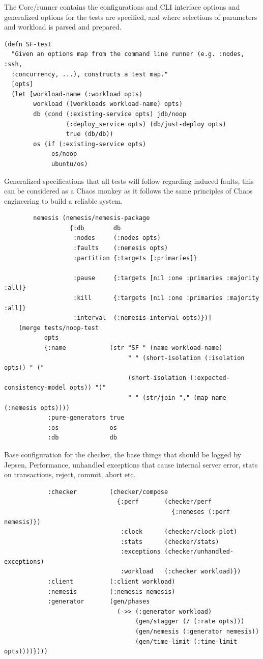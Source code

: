 \documentclass[a4paper,10pt,titlepage]{report}
\begin{document}
        The Core/runner contains the configurations and CLI interface options and generalized options for the tests are specified, and where selections of parameters and workload is parsed and prepared.
\begin{lstlisting}        
(defn SF-test
  "Given an options map from the command line runner (e.g. :nodes, :ssh,
  :concurrency, ...), constructs a test map."
  [opts]
  (let [workload-name (:workload opts)
        workload ((workloads workload-name) opts)
        db (cond (:existing-service opts) jdb/noop
                 (:deploy_service opts) (db/just-deploy opts)
                 true (db/db))
        os (if (:existing-service opts)
             os/noop
             ubuntu/os)
\end{lstlisting}  
Generalized specifications that all tests will follow regarding induced faults, this can be considered as a Chaos monkey \cite{Choasmonkey} as it follows the same principles of Chaos engineering to build a reliable system.
\begin{lstlisting}
        nemesis (nemesis/nemesis-package
                  {:db        db
                   :nodes     (:nodes opts)
                   :faults    (:nemesis opts)
                   :partition {:targets [:primaries]}
                   
                   :pause     {:targets [nil :one :primaries :majority :all]}
                   :kill      {:targets [nil :one :primaries :majority :all]}
                   :interval  (:nemesis-interval opts)})]
    (merge tests/noop-test
           opts
           {:name            (str "SF " (name workload-name)
                                  " " (short-isolation (:isolation opts)) " ("
                                  (short-isolation (:expected-consistency-model opts)) ")"
                                  " " (str/join "," (map name (:nemesis opts))))
            :pure-generators true
            :os              os
            :db              db
\end{lstlisting}  
Base configuration for the checker, the base things that should be logged by Jepsen, Performance, unhandled exceptions that cause internal server error, stats on transactions, reject, commit, abort etc.
\begin{lstlisting}
            :checker         (checker/compose
                               {:perf       (checker/perf
                                              {:nemeses (:perf nemesis)})
                                :clock      (checker/clock-plot)
                                :stats      (checker/stats)
                                :exceptions (checker/unhandled-exceptions)
                                :workload   (:checker workload)})
            :client          (:client workload)
            :nemesis         (:nemesis nemesis)
            :generator       (gen/phases
                               (->> (:generator workload)
                                    (gen/stagger (/ (:rate opts)))
                                    (gen/nemesis (:generator nemesis))
                                    (gen/time-limit (:time-limit opts))))})))
\end{lstlisting} 
\end{document}
